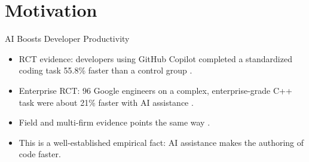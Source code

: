 %
%
%

\section{Motivation}

\begin{frame}{AI Boosts Developer Productivity}
\begin{itemize}
  \item RCT evidence: developers using GitHub Copilot completed a
        standardized coding task 55.8\% faster than a control group
        \cite{peng2023impact}.
  \item Enterprise RCT: 96 Google engineers on a complex,
        enterprise-grade C++ task were about 21\% faster with AI
        assistance \cite{paradis2025speed}.
  \item Field and multi-firm evidence points the same way
        \cite{ziegler2022productivity,cui2024effects}.
  \item This is a well-established empirical fact: AI assistance makes
        the authoring of code faster.
\end{itemize}
\end{frame}

